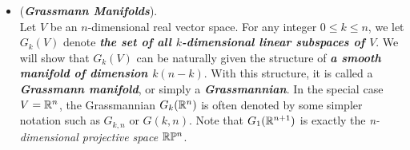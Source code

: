 \documentclass[11pt]{article}
\begin{document}
\begin{itemize}
\item \begin{example} (\emph{\textbf{Grassmann Manifolds}}).\\
Let $V$ be an $n$-dimensional real vector space. For any integer $0 \le k \le n$, we let $G_{k}(V)$ denote \emph{\textbf{the set of all $k$-dimensional linear subspaces of $V$}}. We will show that $G_{k}(V)$ can be naturally given the structure of \emph{\textbf{a smooth manifold of dimension $k(n - k)$}}. With this structure, it is called a \emph{\textbf{Grassmann manifold}}, or simply a \emph{\textbf{Grassmannian}}. In the special case $V = {\mathbb R}^n$, the Grassmannian $G_{k}({\mathbb R}^n)$ is often denoted by some simpler notation such as $G_{k,n}$ or $G(k,n)$. Note that $G_1({\mathbb R}^{n+1})$ is exactly the \emph{n-dimensional projective space} ${\mathbb R}{\mathbb P}^n$.
\end{example}
\end{itemize}
\end{document}
